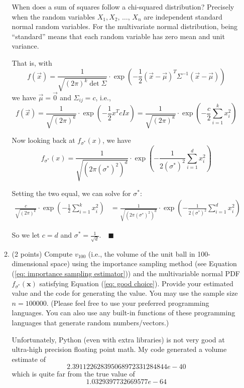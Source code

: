 \documentclass[11pt,letterpaper, leqno]{article}
\numberwithin{equation}{section}
\numberwithin{theorem}{section}
\numberwithin{lemma}{section}
\numberwithin{corollary}{section}
\numberwithin{definition}{section}
\numberwithin{proposition}{section}
\numberwithin{remark}{section}
\numberwithin{example}{section}
\renewcommand{\qed}{\quad \blacksquare}
\begin{document}
\begin{enumerate}
\begin{enumerate}
                        When does a sum of squares follow a chi-squared distribution? Precisely when the random variables $X_1, X_2, \, \dots,\, X_n$ are independent standard normal random variables. For the multivariate normal distribution, being ``standard'' means that each random variable has zero mean and unit variance. 

                        That is, with 
                        \[f(\vec x) = \frac{1}{\sqrt{(2\pi)^k \det \Sigma}} \cdot \exp\left(-\frac{1}{2}(\vec x - \vec \mu)^T\Sigma^{-1}(\vec x -
                        \vec \mu)\right)\]
                        we have $\vec \mu = \vec 0$ and $\Sigma_{ij} = c$, i.e.,
                        \[f(\vec x) = \frac{1}{\sqrt{(2\pi)^k}}\cdot \exp\left(-\frac{1}{2} x^T cI x\right) = \frac{1}{\sqrt{(2\pi)^k}}\cdot \exp\left(-\frac{c}{2}\sum_{i=1}^k x_i^2\right)\]

                        Now looking back at $f_{\sigma^*}(x)$, we have 
                        \[f_{\sigma^*}(x) = \frac{1}{\sqrt{(2\pi (\sigma^*)^2)^d}}\cdot \exp\left(-\frac{1}{2(\sigma^*)^2} \sum_{i=1}^d x_i^2\right)\]

                        Setting the two equal, we can solve for $\sigma^*$:
                        \begin{align*}
                            \frac{c}{\sqrt{(2\pi)^k}}\cdot \exp\left(-\frac{1}{2}\sum_{i=1}^k x_i^2\right) &= \frac{1}{\sqrt{(2\pi (\sigma^*)^2)^d}}\cdot \exp\left(-\frac{1}{2(\sigma^*)^2} \sum_{i=1}^d x_i^2\right)
                        \end{align*}

                        So we let $c = d$ and $\sigma^* = \frac{1}{\sqrt d}. \qed$
                    \color{black}

                \item (2 points) Compute $v_{100}$ (i.e., the volume of the unit ball in 100-dimensional space) using the importance sampling method (see Equation (\ref{eq: importance sampling estimator})) and the multivariable normal PDF $f_{\sigma^*}(\boldsymbol{x})$ satisfying Equation (\ref{eq: good choice}). Provide your estimated value and the code for generating the value. You may use the sample size $n=100000$. (Please feel free to use your preferred programming languages. You can also use any built-in functions of these programming languages that generate random numbers/vectors.)
                
                    \color{blue}
                        Unfortunately, Python (even with extra libraries) is not very good at ultra-high precision floating point math. My code generated a volume estimate of 
                        \[2.391122628395068972331284844e-40\] 
                        which is quite far from the true value of 
                        \[1.0329397732669577e-64\]


\end{enumerate}
\end{enumerate}
\end{document}
